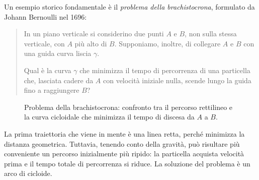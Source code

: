 Un esempio storico fondamentale è il \emph{problema della brachistocrona}, formulato da Johann Bernoulli nel 1696:
\begin{quote}
    In un piano verticale si considerino due punti $A$ e $B$, non sulla stessa verticale, con $A$ più alto di $B$. Supponiamo, inoltre, di collegare $A$ e $B$ con una guida curva liscia $\gamma$.
    
    Qual è la curva $\gamma$ che minimizza il tempo di percorrenza di una particella che, lasciata cadere da $A$ con velocità iniziale nulla, scende lungo la guida fino a raggiungere $B$?
\end{quote}
    \begin{figure}[ht]
        \centering
        \caption{Problema della brachistocrona: confronto tra il percorso rettilineo e la curva cicloidale che minimizza il tempo di discesa da $A$ a $B$.}
        \label{fig:brachistocrona}
    \end{figure}

La prima traiettoria che viene in mente è una linea retta, perché minimizza la distanza geometrica. Tuttavia, tenendo conto della gravità, può risultare più conveniente un percorso inizialmente più ripido: la particella acquista velocità prima e il tempo totale di percorrenza si riduce. La soluzione del problema è un arco di cicloide.

